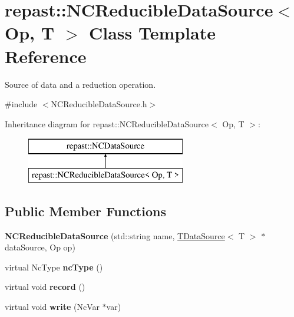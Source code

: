 \hypertarget{classrepast_1_1_n_c_reducible_data_source}{\section{repast\-:\-:N\-C\-Reducible\-Data\-Source$<$ Op, T $>$ Class Template Reference}
\label{classrepast_1_1_n_c_reducible_data_source}
}


Source of data and a reduction operation.  




{\ttfamily \#include $<$N\-C\-Reducible\-Data\-Source.\-h$>$}

Inheritance diagram for repast\-:\-:N\-C\-Reducible\-Data\-Source$<$ Op, T $>$\-:\begin{figure}[H]
\begin{center}
\leavevmode
\includegraphics[height=2.000000cm]{classrepast_1_1_n_c_reducible_data_source}
\end{center}
\end{figure}
\subsection*{Public Member Functions}
\begin{DoxyCompactItemize}
\item 
\hypertarget{classrepast_1_1_n_c_reducible_data_source_abb51dc12d9c9b96651098d47f775f589}{{\bfseries N\-C\-Reducible\-Data\-Source} (std\-::string name, \hyperlink{classrepast_1_1_t_data_source}{T\-Data\-Source}$<$ T $>$ $\ast$data\-Source, Op op)}\label{classrepast_1_1_n_c_reducible_data_source_abb51dc12d9c9b96651098d47f775f589}

\item 
\hypertarget{classrepast_1_1_n_c_reducible_data_source_a232af9bb522eb699fdb9c20e14304588}{virtual Nc\-Type {\bfseries nc\-Type} ()}\label{classrepast_1_1_n_c_reducible_data_source_a232af9bb522eb699fdb9c20e14304588}

\item 
\hypertarget{classrepast_1_1_n_c_reducible_data_source_a3046c509fcffa8bef784ab0152c07e4a}{virtual void {\bfseries record} ()}\label{classrepast_1_1_n_c_reducible_data_source_a3046c509fcffa8bef784ab0152c07e4a}

\item 
\hypertarget{classrepast_1_1_n_c_reducible_data_source_a78425c8622a728038e7b15486445b488}{virtual void {\bfseries write} (Nc\-Var $\ast$var)}\label{classrepast_1_1_n_c_reducible_data_source_a78425c8622a728038e7b15486445b488}

\end{DoxyCompactItemize}

